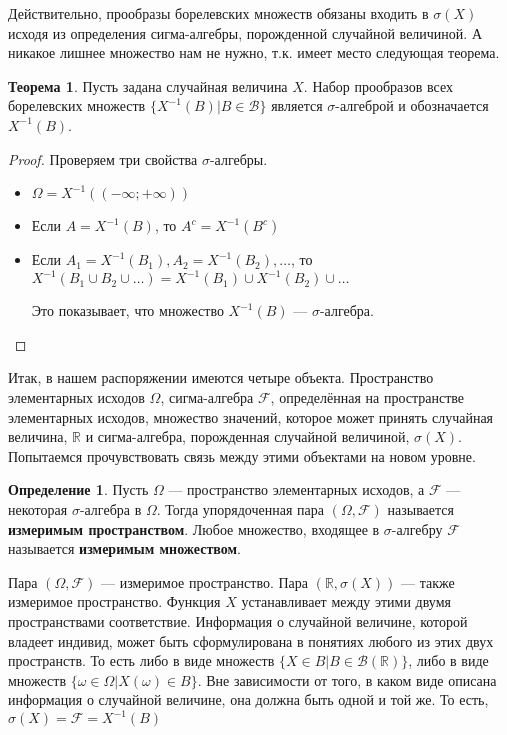 \documentclass[pdftex, 12pt, a4paper]{article}
\def\R{\ensuremath{\mathbb{R}}} %
\def\F{\ensuremath{\mathcal{F}}} %
\def\B{\ensuremath{\mathcal{B}}} %
\def\s{\ensuremath{\sigma}}
\def \Om{\Omega}
\def \om{\omega}
\theoremstyle{definition} %
\newtheorem*{mydef}{Определение}
\newtheorem{myth}{Теорема}
\numberwithin{problem}{section}
\newcommand{\indef}[1]{\textbf{#1}}
\numberwithin{blits}{section}
\begin{document}
 Действительно, прообразы борелевских множеств обязаны входить в $ \sigma(X) $ исходя из определения сигма-алгебры, порожденной случайной величиной. А никакое лишнее множество нам не нужно, т.к. имеет место следующая теорема.

\begin{myth} Пусть задана случайная величина $X$. Набор прообразов всех борелевских множеств $\{X^{-1}(B)|B\in\B\}$ является \s-алгеброй и обозначается $X^{-1}(B)$.
\end{myth}
\begin{proof} Проверяем три свойства \s-алгебры.
\begin{itemize}
\item $\Omega = X^{-1}((-\infty;+\infty))$

\item Если $A = X^{-1}(B)$, то $ A^{c}=X^{-1}(B^{c})$

\item Если $ A_1 = X^{-1}(B_1), A_2 = X^{-1}(B_2), \ldots $, то $X^{-1}(B_1 \cup B_2 \cup \ldots) = X^{-1} (B_1) \cup X^{-1} (B_2) \cup \ldots$

Это показывает, что множество $X^{-1}(B)$ --- \s-алгебра.
\end{itemize}
\end{proof}





Итак, в нашем распоряжении имеются четыре объекта. Пространство элементарных исходов $\Om$, сигма-алгебра \F, определённая на пространстве элементарных исходов, множество значений, которое может принять случайная величина, $\R$ и сигма-алгебра, порожденная случайной величиной, $\s(X)$. Попытаемся прочувствовать связь между этими объектами на новом уровне.  

\begin{mydef}
Пусть $\Om$ --- пространство элементарных исходов, а $\F$ --- некоторая \s-алгебра в $\Om$. Тогда упорядоченная пара $(\Om,\F)$ называется \indef{измеримым пространством}.  Любое множество, входящее в \s-алгебру $\F$ называется \indef{измеримым множеством}. 
\end{mydef}

Пара $(\Om, \F)$ --- измеримое пространство. Пара $(\R, \s(X))$ --- также измеримое пространство. Функция $X$ устанавливает между этими двумя пространствами соответствие. Информация о случайной величине, которой владеет индивид, может быть сформулирована в понятиях любого из этих двух пространств. То есть либо в виде множеств $\{X \in B | B \in \B(\R)\}$, либо в виде множеств $\{\om \in \Om | X(\om) \in B\}$. Вне зависимости от того, в каком виде описана информация о случайной величине, она должна быть одной и той же. То есть, $\s(X) = \F = X^{-1}(B)$  
\end{document}
